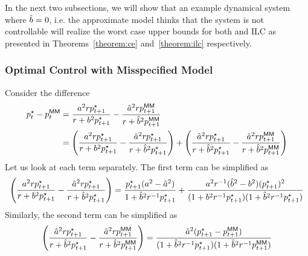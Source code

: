 In the next two subsections, we will show that an example dynamical
system where $\hat{b} = 0$, i.e. the approximate model thinks that the
system is not controllable will realize the worst case upper bounds
for both \MM{} and ILC as presented in Theorems~\ref{theorem:ce}
and~\ref{theorem:ilc} respectively.

\subsubsection{Optimal Control with Misspecified Model}
\label{sec:cert-equiv-contr-1}

Consider the difference
\begin{align*}
  p^\star_t - p^\mathsf{MM}_t &= \frac{a^2rp^\star_{t+1}}{r + b^2p^\star_{t+1}} -
                       \frac{\hat{a}^2rp^\mathsf{MM}_{t+1}}{r +
                       \hat{b}^2p^\mathsf{MM}_{t+1}} \\
  &= \left( \frac{a^2rp^\star_{t+1}}{r + b^2p^\star_{t+1}} -
    \frac{\hat{a}^2rp^\star_{t+1}}{r + \hat{b}^2p^\star_{t+1}} \right) +
    \left( \frac{\hat{a}^2rp^\star_{t+1}}{r + \hat{b}^2p^\star_{t+1}} - \frac{\hat{a}^2rp^\mathsf{MM}_{t+1}}{r +
                       \hat{b}^2p^\mathsf{MM}_{t+1}} \right)
\end{align*}
Let us look at each term separately. The first term can be simplified
as
\begin{equation}
  \label{eq:17}
  \left( \frac{a^2rp^\star_{t+1}}{r + b^2p^\star_{t+1}} -
    \frac{\hat{a}^2rp^\star_{t+1}}{r + \hat{b}^2p^\star_{t+1}} \right) =
                                                                 \frac{p^\star_{t+1}(a^2-
                                                                 \hat{a}^2)}{1
                                                                 +
                                                                 \hat{b}^2r^{-1}p^\star_{t+1}}
                                                                 +
                                                                 \frac{a^2r^{-1}(\hat{b}^2
                                                                 -
                                                                 b^2)(p^\star_{t+1})^2}{(1
                                                                 +
                                                                 b^2r^{-1}p^\star_{t+1})(1
                                                                 +
                                                                 \hat{b}^2r^{-1}p^\star_{t+1})}
\end{equation}
Similarly, the second term can be simplified as
\begin{equation}
  \label{eq:9}
  \left( \frac{\hat{a}^2rp^\star_{t+1}}{r + \hat{b}^2p^\star_{t+1}} - \frac{\hat{a}^2rp^\mathsf{MM}_{t+1}}{r +
                       \hat{b}^2p^\mathsf{MM}_{t+1}} \right) =
                   \frac{\hat{a}^2(p^\star_{t+1} - p^\mathsf{MM}_{t+1})}{(1 +
                     \hat{b}^2r^{-1}p^\star_{t+1})(1 + \hat{b}^2r^{-1}p^\mathsf{MM}_{t+1})}
\end{equation}

